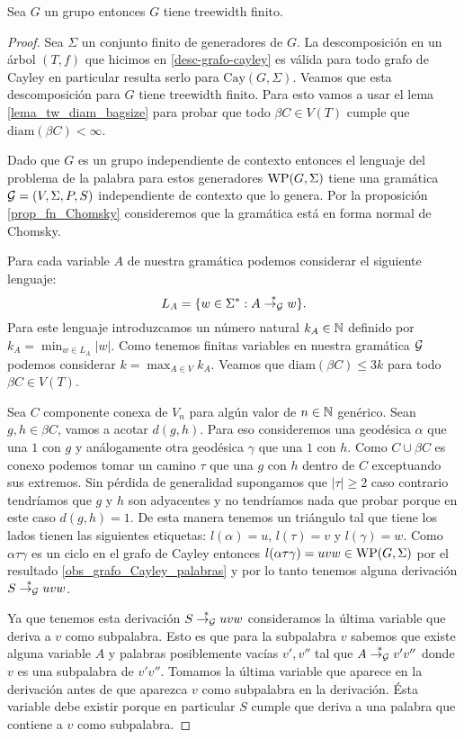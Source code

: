 \documentclass[tesis.tex]{subfiles}
\begin{document}
\begin{teo} \label{teo_ic_implica_tw}\cite{muller1985theory}
	Sea $G$ un grupo \ic entonces $G$ tiene treewidth finito.
\end{teo}
\begin{proof}
	Sea $\Sigma$ un conjunto finito de generadores de $G$.
	La descomposición en un árbol $(T,f)$ que hicimos en \ref{desc-grafo-cayley} es válida para todo grafo de Cayley en particular resulta serlo para $\text{Cay}(G,\Sigma)$.
	Veamos que esta descomposición para $G$ tiene treewidth finito. 
	Para esto vamos a usar el lema \ref{lema_tw_diam_bagsize} para probar que todo $\beta C \in V(T)$ cumple que $\text{diam}(\beta C) < \infty$.
	
	
	Dado que $G$ es un grupo independiente de contexto entonces el lenguaje del problema de la palabra para estos generadores $\text{WP}(G, \Sigma)$ tiene una gramática $ {\cal G} = (V, \Sigma, P, S)$ independiente de contexto que lo genera. 
	Por la proposición \ref{prop_fn_Chomsky} consideremos que la gramática está en forma normal de Chomsky.
	
	Para cada variable $A$ de nuestra gramática podemos considerar el siguiente lenguaje:
	\[
	L_A = \{ w \in \Sigma^* : A \overset{*}{\to_{\cal G}} w  \}.
	\]
	Para este lenguaje introduzcamos un número natural $k_A \in \mathbb{N}$ definido por $k_A = {\min}_{w \in L_A} |w|$. 
	Como tenemos finitas variables en nuestra gramática $\cal G$ podemos considerar $k = \max_{A \in V} k_A$. 
	Veamos que $\text{diam}(\beta C) \le 3k$ para todo $\beta C \in V(T)$.
	
	Sea $C$ componente conexa de $V_{n}$ para algún valor de $n \in \mathbb{N}$ genérico.
	Sean $g,h \in \beta C$, vamos a acotar $d(g,h)$. 
	Para eso consideremos una geodésica $\alpha$ que una $1$ con $g$ y análogamente otra geodésica $\gamma$ que una $1$ con $h$. 
	Como $C \cup \beta C$ es conexo podemos tomar un camino $\tau$ que una $g$ con $h$ dentro de $C$ exceptuando sus extremos. 
	Sin pérdida de generalidad supongamos que $|\tau| \ge 2$ caso contrario tendríamos que $g$ y $h$ son adyacentes y no tendríamos nada que probar porque en este caso $d(g,h) =1$.
	De esta manera tenemos un triángulo tal que tiene los lados tienen las siguientes etiquetas:
	$l(\alpha) = u $, $l(\tau) =v$ y $l(\gamma) = w$.
	Como $\alpha \tau \gamma$ es un ciclo en el grafo de Cayley entonces $l(\alpha \tau \gamma) = uvw \in  \text{WP}(G, \Sigma)$ por el resultado \ref{obs_grafo_Cayley_palabras} y por lo tanto tenemos alguna derivación $S \overset{*}{\to_{\cal G}} uvw$.
	
	Ya que tenemos esta derivación $S \overset{*}{\to_{\cal G}} uvw$ consideramos la última variable que deriva a $v$ como subpalabra. 
	Esto es que para la subpalabra $v$ sabemos que existe alguna variable $A$ y palabras posiblemente vacías $v',v''$ tal que $A \overset{*}{\to_{\cal G}} v'v''$ donde $v$ es una subpalabra de $v'v''$. 
	Tomamos la última variable que aparece en la derivación antes de que aparezca $v$ como subpalabra en la derivación.
	Ésta variable debe existir porque en particular $S$ cumple que deriva a una palabra que contiene a $v$ como subpalabra.
	

\end{proof}
\end{document}
